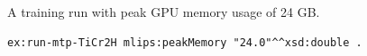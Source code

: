 A training run with peak GPU memory usage of 24 GB.
\begin{lstlisting}[language=turtle]
ex:run-mtp-TiCr2H mlips:peakMemory "24.0"^^xsd:double .
\end{lstlisting}
